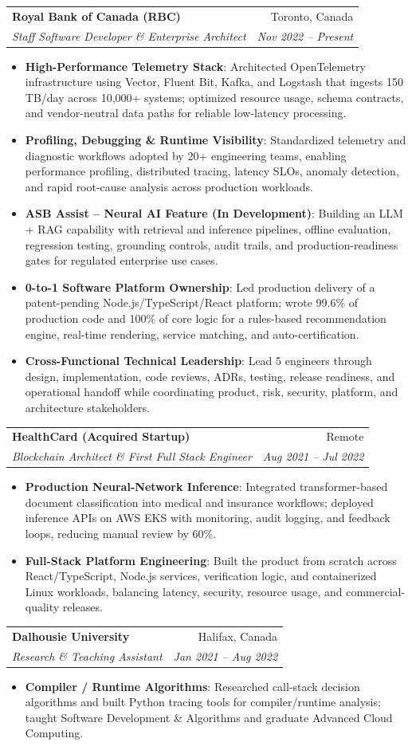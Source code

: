 \documentclass[letterpaper,9.5pt]{article}
\makeatletter
\newcommand{\resumeItem}[2]{\item\small{\textbf{#1}{: #2 \vspace{-2pt}}}}
\newcommand{\resumeSubheading}[4]{\vspace{-2pt}\item\begin{tabular*}{0.97\textwidth}{l@{\extracolsep{\fill}}r}\textbf{#1} & #2 \\\textit{\small#3} & \textit{\small #4} \\\end{tabular*}\vspace{-6pt}}
\newcommand{\resumeItemListStart}{\begin{itemize}}
\newcommand{\resumeItemListEnd}{\end{itemize}\vspace{-6pt}}
\makeatother
\begin{document}
  \resumeSubheading
    {Royal Bank of Canada (RBC)}{Toronto, Canada}
    {Staff Software Developer \& Enterprise Architect}{Nov 2022 -- Present}
  \resumeItemListStart
    \resumeItem{High-Performance Telemetry Stack}
      {Architected OpenTelemetry infrastructure using Vector, Fluent Bit, Kafka, and Logstash that ingests 150\,TB/day across 10,000+ systems; optimized resource usage, schema contracts, and vendor-neutral data paths for reliable low-latency processing.}
    \resumeItem{Profiling, Debugging \& Runtime Visibility}
      {Standardized telemetry and diagnostic workflows adopted by 20+ engineering teams, enabling performance profiling, distributed tracing, latency SLOs, anomaly detection, and rapid root-cause analysis across production workloads.}
    \resumeItem{ASB Assist -- Neural AI Feature (In Development)}
      {Building an LLM + RAG capability with retrieval and inference pipelines, offline evaluation, regression testing, grounding controls, audit trails, and production-readiness gates for regulated enterprise use cases.}
    \resumeItem{0-to-1 Software Platform Ownership}
      {Led production delivery of a patent-pending Node.js/TypeScript/React platform; wrote 99.6\% of production code and 100\% of core logic for a rules-based recommendation engine, real-time rendering, service matching, and auto-certification.}
    \resumeItem{Cross-Functional Technical Leadership}
      {Lead 5 engineers through design, implementation, code reviews, ADRs, testing, release readiness, and operational handoff while coordinating product, risk, security, platform, and architecture stakeholders.}
  \resumeItemListEnd

  \resumeSubheading
    {HealthCard (Acquired Startup)}{Remote}
    {Blockchain Architect \& First Full Stack Engineer}{Aug 2021 -- Jul 2022}
  \resumeItemListStart
    \resumeItem{Production Neural-Network Inference}
      {Integrated transformer-based document classification into medical and insurance workflows; deployed inference APIs on AWS EKS with monitoring, audit logging, and feedback loops, reducing manual review by 60\%.}
    \resumeItem{Full-Stack Platform Engineering}
      {Built the product from scratch across React/TypeScript, Node.js services, verification logic, and containerized Linux workloads, balancing latency, security, resource usage, and commercial-quality releases.}
  \resumeItemListEnd

  \resumeSubheading
    {Dalhousie University}{Halifax, Canada}
    {Research \& Teaching Assistant}{Jan 2021 -- Aug 2022}
  \resumeItemListStart
    \resumeItem{Compiler / Runtime Algorithms}
      {Researched call-stack decision algorithms and built Python tracing tools for compiler/runtime analysis; taught Software Development \& Algorithms and graduate Advanced Cloud Computing.}
  \resumeItemListEnd
\end{document}

